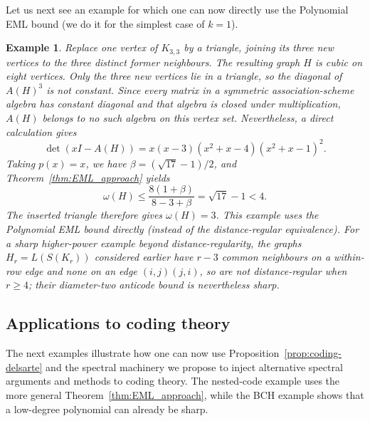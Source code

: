 \documentclass[10pt,a4paper]{article}
\theoremstyle{plain}
\newtheorem{example}{Example}[section]
\numberwithin{equation}{section}
\begin{document}

Let us next see an example for which one can now directly use the Polynomial EML bound (we do it for the simplest case of $k=1$).

\begin{example}
Replace one vertex of $K_{3,3}$ by a triangle, joining its three new vertices to the three distinct former neighbours. The resulting graph $H$ is cubic on eight vertices. Only the three new vertices lie in a triangle, so the diagonal of $A(H)^3$ is not constant. Since every matrix in a symmetric association-scheme algebra has constant diagonal and that algebra is closed under multiplication, $A(H)$ belongs to no such algebra on this vertex set. Nevertheless, a direct calculation gives
\[
 \det(xI-A(H))=x(x-3)(x^2+x-4)(x^2+x-1)^2.
\]
Taking $p(x)=x$, we have $\beta=(\sqrt{17}-1)/2$, and Theorem~\ref{thm:EML_approach} yields
\[
 \omega(H)\le\frac{8(1+\beta)}{8-3+\beta}
 =\sqrt{17}-1<4.
\]
The inserted triangle therefore gives $\omega(H)=3$. This example uses the Polynomial EML bound directly (instead of the distance-regular equivalence). For a sharp higher-power example beyond distance-regularity, the graphs $H_r=L(S(K_r))$ considered earlier have $r-3$ common neighbours on a within-row edge and none on an edge $(i,j)(j,i)$, so are not distance-regular when $r\ge4$; their diameter-two anticode bound is nevertheless sharp.
\end{example}



\subsection{Applications to coding theory}
The next  examples illustrate how one can now use Proposition~\ref{prop:coding-delsarte} and the spectral machinery we propose to inject alternative spectral arguments and methods to coding theory. The nested-code example uses the more general Theorem~\ref{thm:EML_approach}, while the BCH example shows that a low-degree polynomial can already be sharp.
\end{document}
